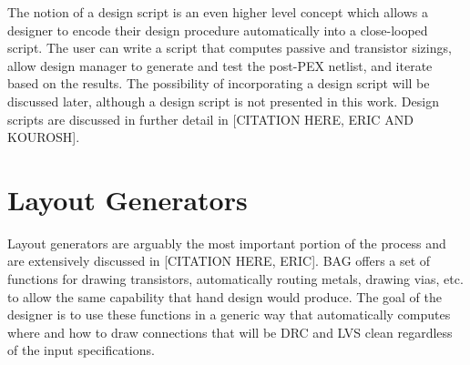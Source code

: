 The notion of a design script is an even higher level concept which allows a designer to encode their design procedure automatically into a close-looped script. The user can write a script that computes passive and transistor sizings, allow design manager to generate and test the post-PEX netlist, and iterate based on the results. The possibility of incorporating a design script will be discussed later, although a design script is not presented in this work. Design scripts are discussed in further detail in [CITATION HERE, ERIC AND KOUROSH].

\section{Layout Generators}
Layout generators are arguably the most important portion of the process and are extensively discussed in [CITATION HERE, ERIC]. BAG offers a set of functions for drawing transistors, automatically routing metals, drawing vias, etc. to allow the same capability that hand design would produce. The goal of the designer is to use these functions in a generic way that automatically computes where and how to draw connections that will be DRC and LVS clean regardless of the input specifications. 

